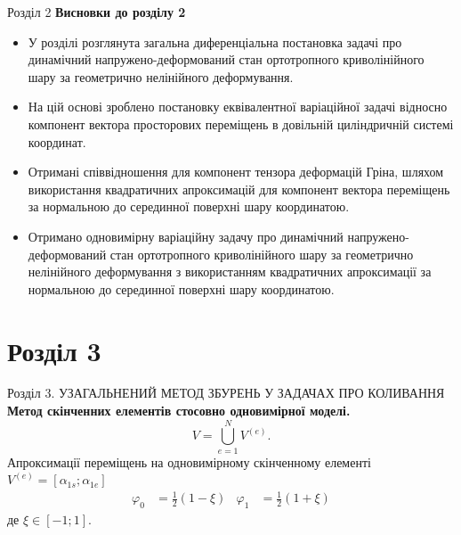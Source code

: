 \documentclass[8pt]{beamer}
\numberwithin{figure}{section}
\numberwithin{equation}{section}
\numberwithin{table}{section}
\begin{document}
\begin{frame}{Розділ 2}
\textbf{Висновки до розділу 2}\\
\vspace{1em}
\begin{itemize}
\item У розділі розглянута загальна диференціальна постановка задачі про динамічний напружено-деформований стан ортотропного криволінійного шару за геометрично нелінійного деформування.
\item На цій основі зроблено постановку еквівалентної варіаційної задачі відносно компонент вектора просторових переміщень в довільній циліндричній системі координат.
\item Отримані співвідношення для компонент тензора деформацій Гріна, шляхом використання квадратичних апроксимацій для компонент вектора переміщень за нормальною до серединної поверхні шару координатою.
\item Отримано одновимірну варіаційну задачу про динамічний напружено-деформований стан ортотропного криволінійного шару за геометрично нелінійного деформування з використанням квадратичних апроксимації за нормальною до серединної поверхні шару координатою. 
\end{itemize}

\end{frame}

\section{Розділ 3}
\begin{frame}{Розділ 3. УЗАГАЛЬНЕНИЙ МЕТОД ЗБУРЕНЬ У ЗАДАЧАХ ПРО КОЛИВАННЯ}
\textbf{Метод скінченних елементів стосовно одновимірної моделі.}
\\
\vspace{1em}
\begin{equation}
V=\bigcup\limits_{e=1}^{N} V^{(e)}.
\end{equation}
Апроксимації переміщень на одновимірному скінченному елементі $V^{(e)} = [\alpha_{1s};\alpha_{1e}]$
\begin{equation}
\begin{aligned}
\varphi_0&=\frac{1}{2}\left(1-\xi\right) & \varphi_1 &=\frac{1}{2}\left(1+\xi\right)
\end{aligned}
\end{equation}
де $\xi \in [-1;1]$.
\end{frame}
\end{document}
